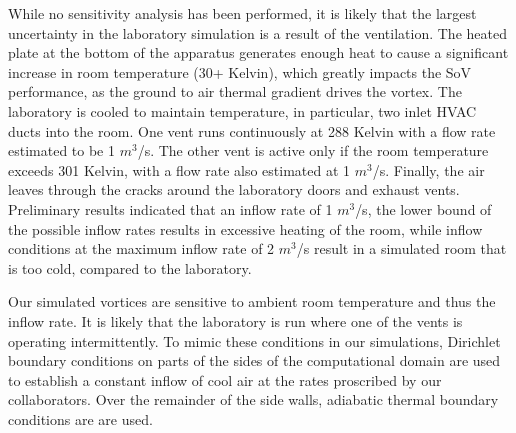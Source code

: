 %
%
%
% 
%
%



While no sensitivity analysis has been performed, it is likely that the
largest uncertainty in the laboratory simulation is a result of the
ventilation. The heated plate at the bottom of the apparatus
generates enough heat to cause a significant increase in room
temperature (30+ Kelvin), which greatly impacts the SoV
performance, as the ground to air thermal gradient drives the
vortex. The laboratory is cooled to maintain
temperature, in particular, two inlet HVAC ducts into the room. 
One vent runs continuously at 288 Kelvin with a flow rate estimated 
to be 1 $m^3$/s.
The other vent is active only if the room temperature exceeds 301 Kelvin, 
with a flow rate also estimated at 1 $m^3$/s.
Finally, the air leaves through the cracks around the laboratory doors and 
exhaust vents. 
Preliminary results indicated that an
inflow rate of 1 $m^3$/s, the lower bound of the possible inflow rates 
results in excessive heating of the room, while inflow conditions at the 
maximum inflow rate of 2 $m^3$/s result in a simulated room that 
is too cold, compared to the laboratory. 

Our simulated vortices are sensitive to ambient room temperature and thus 
the inflow rate. It is likely that the laboratory is run where one of
the vents is operating intermittently. 
To mimic these conditions in our simulations, Dirichlet boundary conditions 
on parts of the sides of the computational domain are used to
establish a constant inflow of cool air at the rates 
proscribed by our collaborators. Over the remainder of the side walls, 
adiabatic thermal boundary conditions are are used. 

